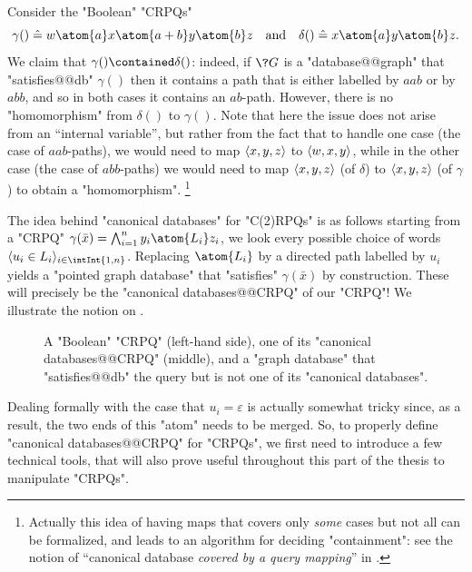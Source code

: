 \begin{example}
    Consider the "Boolean" "CRPQs"
    \[
        \gamma() \defeq w \atom{a} x \atom{a+b} y \atom{b} z
        \quad\text{and}\quad 
        \delta() \defeq x \atom{a} y \atom{b} z.
    \]
    We claim that $\gamma() \contained \delta()$: indeed, 
    if $\?G$ is a "database@@graph" that "satisfies@@db" $\gamma()$
    then it contains a path that is either labelled by
    $aab$ or by $abb$, and so in both cases it contains an $ab$-path.
    However, there is no "homomorphism" from $\delta()$ to $\gamma()$.
    Note that here the issue does not arise from an
    ``internal variable'', but rather from the fact that
    to handle one case (the case of $aab$-paths), we would need to
    map $\tup{x,y,z}$ to $\tup{w,x,y}$, while in the other case (the case of
    $abb$-paths) we would need to map $\tup{x,y,z}$ (of $\delta$)
    to $\tup{x,y,z}$ (of $\gamma$) to obtain a "homomorphism".%
    \footnote[][-10em]{Actually this idea of having maps that covers only \emph{some} cases
    but not all can be formalized, and leads to an algorithm
    for deciding "containment": see the notion of
    ``canonical database \emph{covered by a query mapping}'' in \cite{FlorescuLevySuciu1998Containment}.}
\end{example}

The idea behind "canonical databases" for "C(2)RPQs" is as follows
starting from a "CRPQ" $\gamma(\bar x) = \bigwedge_{i=1}^n y_i \atom{L_i} z_i$,
we look every possible choice of words $\tup{u_i \in L_i}_{i\in \intInt{1,n}}$.
Replacing $\atom{L_i}$ by a directed path labelled by $u_i$ yields a "pointed graph database"
that "satisfies" $\gamma(\bar x)$ by construction. These will precisely be
the "canonical databases@@CRPQ" of our "CRPQ"! We illustrate the notion on
.
\begin{figure}
    \centering
    \begin{tikzpicture}
        
    \end{tikzpicture}
    \caption{\AP\label{fig:first-ex-cdb-wow-im-moved}
    A "Boolean" "CRPQ" (left-hand side), one of its "canonical databases@@CRPQ"
    (middle), and a "graph database" that "satisfies@@db" the query but is not one of its "canonical databases".
    }
\end{figure}
Dealing formally with the case that $u_i = \varepsilon$ is actually somewhat tricky
since, as a result, the two ends of this "atom" needs to be merged.
So, to properly define "canonical databases@@CRPQ" for "CRPQs",
we first need to introduce a few technical tools, that will also prove useful throughout this
part of the thesis to manipulate "CRPQs".

